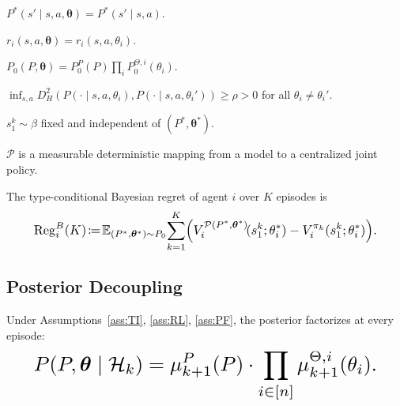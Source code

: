 \begin{assumption}[TI]\label{ass:TI}$P^*(s'\!\mid\! s,a,\boldsymbol\theta)=P^*(s'\!\mid\! s,a)$.\end{assumption}
\begin{assumption}[RL]\label{ass:RL}$r_i(s,a,\boldsymbol\theta)=r_i(s,a,\theta_i)$.\end{assumption}
\begin{assumption}[PF]\label{ass:PF}$P_0(P,\boldsymbol\theta)=P_0^P(P)\prod_i P_0^{\Theta,i}(\theta_i)$.\end{assumption}
\begin{assumption}[TID]\label{ass:TID}$\inf_{s,a}D_H^2(P(\cdot\!\mid\! s,a,\theta_i),P(\cdot\!\mid\! s,a,\theta_i'))\geq\rho>0$ for all $\theta_i\!\neq\!\theta_i'$.\end{assumption}
\begin{assumption}[ISI]\label{ass:ISI}$s_1^k\sim\beta$ fixed and independent of $(P^*,\boldsymbol\theta^*)$.\end{assumption}
\begin{assumption}[DP]\label{ass:DP}$\mathcal P$ is a measurable deterministic mapping from a model to a centralized joint policy.\end{assumption}

The type-conditional Bayesian regret of agent $i$ over $K$ episodes is
\begin{equation}\label{eq:regret-def}\resizebox{0.9\linewidth}{!}{$\displaystyle \mathrm{Reg}_i^B(K) \!\coloneqq\! \mathbb{E}_{(P^*,\boldsymbol\theta^*)\sim P_0}\!\sum_{k=1}^K\!\Big(V_i^{\mathcal P(P^*,\boldsymbol\theta^*)}\!(s_1^k;\theta_i^*) - V_i^{\pi_k}(s_1^k;\theta_i^*)\Big). $}\end{equation}

\subsection{Posterior Decoupling}
\label{app:decoupling-proof}
\label{sec:decoupling}

\begin{theorem}
\label{thm:decoupling-app}
Under Assumptions~\ref{ass:TI}, \ref{ass:RL}, \ref{ass:PF}, the posterior factorizes at every episode:
\begin{equation}\label{eq:decoupling-app}\resizebox{0.9\linewidth}{!}{$\displaystyle P(P, \boldsymbol{\theta} \mid \mathcal{H}_k) = \mu_{k+1}^P(P) \cdot \prod_{i \in [n]} \mu_{k+1}^{\Theta,i}(\theta_i). $}\end{equation}
\end{theorem}

